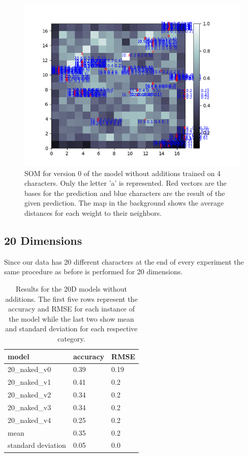 \begin{figure}[!htb]
	\centering
	\includegraphics[width=\textwidth]{images/SOM_graphics/17x17_4d_naked_v0/a.png}
	\caption{SOM for version 0 of the model without additions trained on 4 characters. Only the letter 'a' is represented. Red vectors are the bases for the prediction and blue characters are the result of the given prediction. The map in the background shows the average distances for each weight to their neighbors.}
	\label{fig:4d_naked_a}
\end{figure}

\subsection{20 Dimensions}

Since our data has 20 different characters at the end of every experiment the same procedure as before is performed for 20 dimensions.


\begin{table}[!htb]
	\centering
	\caption{Results for the 20D models without additions. The first five rows represent the accuracy and RMSE for each instance of the model while the last two show mean and standard deviation for each respective category.}
	\begin{tabularx}{\textwidth}{ X  X  X }
		\hline
		model & accuracy & RMSE \\ 
		\hline
		20\_naked\_v0 & 0.39 & 0.19\\ 
		20\_naked\_v1 & 0.41 & 0.2 \\
		20\_naked\_v2 & 0.34 & 0.2 \\ 
		20\_naked\_v3 & 0.34 & 0.2 \\ 
		20\_naked\_v4 & 0.25 & 0.2 \\ \hline
		mean & 0.35 & 0.2\\
		standard deviation & 0.05 & 0.0\\
		\hline
	\end{tabularx}
	\label{table:20_naked}
\end{table}

